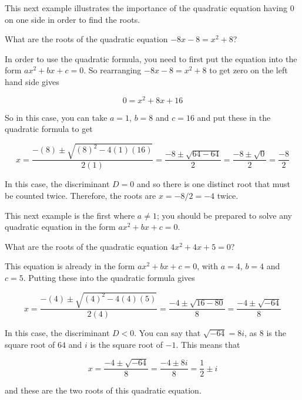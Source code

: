 \documentclass[
  12pt,
  a4paper, oneside]{starmastarticle}
\begin{document}
This next example illustrates the importance of the quadratic equation
having \(0\) on one side in order to find the roots.

\begin{tcolorbox}[enhanced jigsaw, toprule=.15mm, opacityback=0, bottomrule=.15mm, arc=.35mm, left=2mm, rightrule=.15mm, breakable, leftrule=.75mm, colframe=quarto-callout-note-color-frame, colback=white]
\begin{minipage}[t]{5.5mm}
\textcolor{quarto-callout-note-color}{\faInfo}
\end{minipage}%
\begin{minipage}[t]{\textwidth - 5.5mm}
What are the roots of the quadratic equation \(-8x - 8 = x^2 + 8\)?

In order to use the quadratic formula, you need to first put the
equation into the form \(ax^2 + bx + c = 0\). So rearranging
\(-8x - 8 = x^2 + 8\) to get zero on the left hand side gives

\[0 = x^2 + 8x + 16\]

So in this case, you can take \(a = 1\), \(b = 8\) and \(c = 16\) and
put these in the quadratic formula to get

\[ x = \frac{-(8) \pm \sqrt{(8)^2 - 4(1)(16)}}{2(1)} = \frac{-8 \pm \sqrt{64 - 64}}{2} = \frac{-8 \pm \sqrt{0}}{2} = \frac{-8}{2}\]

In this case, the discriminant \(D = 0\) and so there is one distinct
root that must be counted twice. Therefore, the roots are
\(x = -8/2 = -4\) twice.\end{minipage}%
\end{tcolorbox}

This next example is the first where \(a \neq 1\); you should be
prepared to solve any quadratic equation in the form
\(ax^2 + bx + c = 0\).

\begin{tcolorbox}[enhanced jigsaw, toprule=.15mm, opacityback=0, bottomrule=.15mm, arc=.35mm, left=2mm, rightrule=.15mm, breakable, leftrule=.75mm, colframe=quarto-callout-note-color-frame, colback=white]
\begin{minipage}[t]{5.5mm}
\textcolor{quarto-callout-note-color}{\faInfo}
\end{minipage}%
\begin{minipage}[t]{\textwidth - 5.5mm}
What are the roots of the quadratic equation \(4x^2 + 4x + 5 = 0\)?

This equation is already in the form \(ax^2 + bx + c = 0\), with
\(a = 4\), \(b = 4\) and \(c = 5\). Putting these into the quadratic
formula gives

\[ x = \frac{-(4) \pm \sqrt{(4)^2 - 4(4)(5)}}{2(4)} = \frac{-4 \pm \sqrt{16 - 80}}{8} = \frac{-4 \pm \sqrt{-64}}{8}\]

In this case, the discriminant \(D < 0\). You can say that
\(\sqrt{-64} = 8i\), as \(8\) is the square root of \(64\) and \(i\) is
the square root of \(-1\). This means that

\[x = \frac{-4 \pm \sqrt{-64}}{8} = \frac{-4 \pm 8i}{8} = \frac{1}{2}\pm i\]

and these are the two roots of this quadratic equation.\end{minipage}%
\end{tcolorbox}
\end{document}
